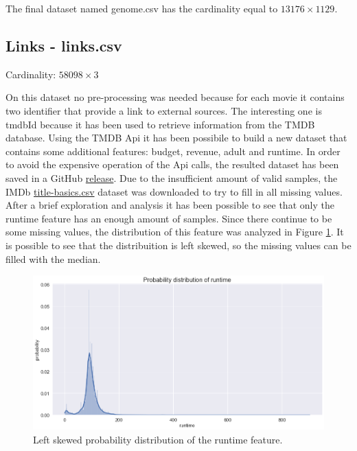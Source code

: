 \documentclass[../main]{subfiles}
\begin{document}
The final dataset named genome.csv has the cardinality equal to $13176 \times 1129$.

\subsection*{Links - links.csv}
Cardinality: $58098 \times 3$

On this dataset no pre-processing was needed because for each movie it contains two identifier that provide a link to external sources.
The interesting one is tmdbId because it has been used to retrieve information from the TMDB database.
Using the TMDB Api it has been possibile to build a new dataset that contains some additional features: budget, revenue, adult and runtime.
In order to avoid the expensive operation of the Api calls, the resulted dataset has been saved in a GitHub \href{https://github.com/prushh/movie-lens-mlp/releases/tag/api-dataset}{release}.
Due to the insufficient amount of valid samples, the IMDb \href{https://datasets.imdbws.com/title.basics.tsv.gz}{title-basics.csv} dataset was downloaded to try to fill in all missing values.
After a brief exploration and analysis it has been possible to see that only the runtime feature has an enough amount of samples.
Since there continue to be some missing values, the distribution of this feature was analyzed in Figure \ref{fig:runtime_distribution_missing}.
It is possible to see that the distribuition is left skewed, so the missing values can be filled with the median.

\begin{figure}[h]
    \center
    \includegraphics[width=\linewidth]{figures/runtime_distribution_missing.png}
    \caption{Left skewed probability distribution of the runtime feature.}
    \label{fig:runtime_distribution_missing}
\end{figure}
\end{document}
